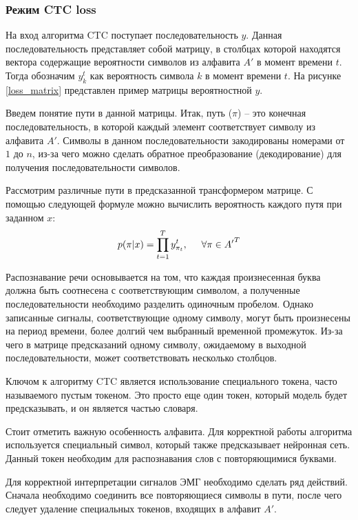 \subsubsection{Режим CTC loss}

На вход алгоритма CTC поступает последовательность $y$. Данная последовательность представляет собой матрицу, в столбцах которой находятся вектора содержащие вероятности символов из алфавита $A'$ в момент времени $t$. Тогда обозначим $y_k^t$  как вероятность символа $k$ в момент времени $t$. На рисунке \ref{loss_matrix} представлен пример матрицы вероятностной $y$.

Введем понятие пути в данной матрицы. Итак, путь ($\pi$) – это конечная последовательность, в которой каждый элемент соответствует символу из алфавита $A'$. Символы в данном последовательности закодированы номерами от $1$ до $n$, из-за чего можно сделать обратное преобразование (декодирование) для получения последовательности символов.


Рассмотрим различные пути в предсказанной трансформером матрице. С помощью следующей формуле можно вычислить вероятность каждого путя при заданном $x$:
\begin{equation}
    p(\pi | x) = \prod\limits_{t=1}^T y^t_{\pi_t},\hspace{0.5cm} \forall\pi\in {A'}^T 
\end{equation}

Распознавание речи основывается на том, что каждая произнесенная буква должна быть соотнесена с соответствующим символом, а полученные последовательности необходимо разделить одиночным пробелом. Однако записанные сигналы, соответствующие одному символу, могут быть произнесены на период времени, более долгий чем выбранный временной промежуток. Из-за чего в матрице предсказаний одному символу, ожидаемому в выходной последовательности, может соответствовать несколько столбцов.

Ключом к алгоритму CTC является использование специального токена, часто называемого пустым токеном. Это просто еще один токен, который модель будет предсказывать, и он является частью словаря.

Стоит отметить важную особенность алфавита. Для корректной работы алгоритма используется специальный символ, который также предсказывает нейронная сеть. Данный токен необходим для распознавания слов с повторяющимися буквами.

Для корректной интерпретации сигналов ЭМГ необходимо сделать ряд действий. Сначала необходимо соединить все повторяющиеся символы в пути, после чего следует удаление специальных токенов, входящих в алфавит $A'$.

